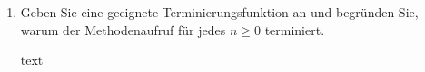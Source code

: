 \documentclass{lehramt-informatik-aufgabe}
\begin{document}
\begin{enumerate}
\begin{liAntwort}
\end{liAntwort}


\item Geben Sie eine geeignete Terminierungsfunktion an und begründen
Sie, warum der Methodenaufruf  für jedes $n \geq 0$
terminiert.

\begin{liAntwort}
text
\end{liAntwort}

\end{enumerate}
\end{document}
